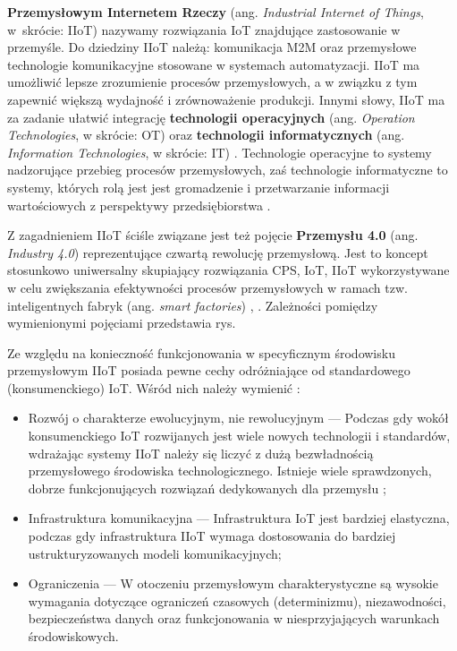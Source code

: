 \documentclass[a4paper, 12pt, twoside]{article}
\begin{document}
\textbf{Przemysłowym Internetem Rzeczy} (ang. \emph{Industrial Internet of Things}, w~skrócie: IIoT)
nazywamy rozwiązania IoT znajdujące zastosowanie w przemyśle. Do dziedziny
IIoT należą: komunikacja M2M oraz przemysłowe technologie komunikacyjne stosowane
w systemach automatyzacji. IIoT ma umożliwić lepsze zrozumienie procesów
przemysłowych, a w związku z tym zapewnić większą wydajność i zrównoważenie
produkcji. Innymi słowy, IIoT ma za zadanie ułatwić integrację \textbf{technologii operacyjnych}
(ang. \emph{Operation Technologies}, w skrócie: OT) oraz
\textbf{technologii informatycznych} (ang. \emph{Information Technologies}, w skrócie: IT)
\cite{iiot-challenges-opportunities-directions}.
Technologie operacyjne to systemy nadzorujące przebieg procesów przemysłowych,
zaś technologie informatyczne to systemy, których rolą jest jest gromadzenie
i przetwarzanie informacji wartościowych z perspektywy przedsiębiorstwa
\cite{ot-it-categorization-of-customer-concerns}.

Z zagadnieniem IIoT ściśle związane jest też pojęcie \textbf{Przemysłu 4.0} (ang. \emph{Industry 4.0})
reprezentujące czwartą rewolucję przemysłową. Jest to koncept stosunkowo uniwersalny
skupiający rozwiązania CPS, IoT, IIoT wykorzystywane w celu zwiększania efektywności
procesów przemysłowych w ramach tzw. inteligentnych fabryk (ang. \emph{smart factories})
\cite{iiot-cyber-manufacturing-systems}, \cite{iiot-challenges-opportunities-directions}.
Zależności pomiędzy wymienionymi pojęciami przedstawia rys.


Ze względu na konieczność funkcjonowania w specyficznym środowisku przemysłowym
IIoT posiada pewne cechy odróżniające od standardowego (konsumenckiego) IoT.
Wśród nich należy wymienić \cite{iiot-challenges-opportunities-directions}:
\begin{itemize}
      \itemsep0em
      \item Rozwój o charakterze ewolucyjnym, nie rewolucyjnym
            --- Podczas gdy wokół konsumenckiego IoT rozwijanych jest wiele nowych technologii i standardów,
            wdrażając systemy IIoT należy się liczyć z dużą bezwładnością
            przemysłowego środowiska technologicznego. Istnieje wiele sprawdzonych, dobrze
            funkcjonujących rozwiązań dedykowanych dla przemysłu \cite{isp};
      \item Infrastruktura komunikacyjna
            --- Infrastruktura IoT jest bardziej elastyczna, podczas gdy infrastruktura
            IIoT wymaga dostosowania do bardziej ustrukturyzowanych modeli komunikacyjnych;
      \item Ograniczenia
            --- W otoczeniu przemysłowym charakterystyczne są wysokie wymagania dotyczące
            ograniczeń czasowych (determinizmu), niezawodności, bezpieczeństwa danych oraz
            funkcjonowania w niesprzyjających warunkach środowiskowych.
\end{itemize}
\end{document}
